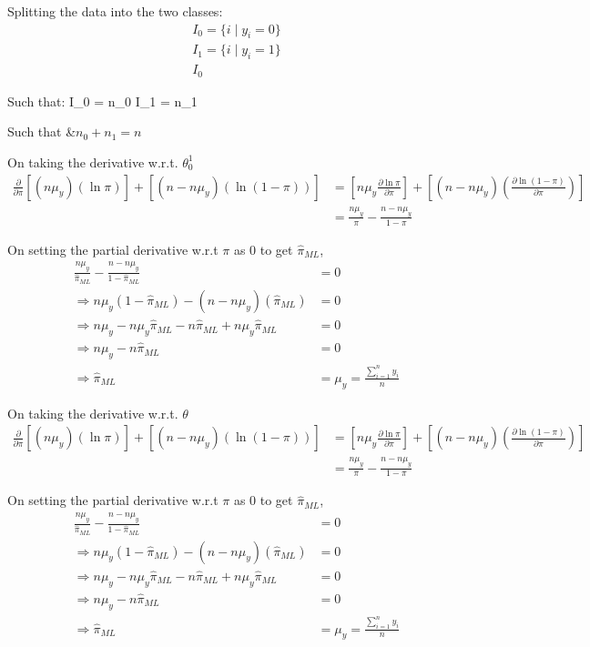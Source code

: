 \documentclass[openany,11pt]{homework}
\begin{document}
Splitting the data into the two classes: \\
\begin{align}
I_0 = \{i \mid y_i = 0\} \\
I_1 = \{i \mid y_i = 1\} \\
I_0 
\end{align}

Such that:
\mid I_0 \mid = n_0 
\mid I_1 \mid = n_1

Such that &$n_0 + n_1 = n$



On taking the derivative w.r.t. $\theta_{0}^{1}$\\
\begin{align}
\frac{\partial }{\partial \pi} [(n\mu_y) (\ln \pi)] + [(n - n\mu_y)(\ln (1-\pi))]
& = \left[n\mu_y \frac{\partial \ln \pi}{\partial \pi}\right] + \left[(n - n\mu_y)\left(\frac{\partial \ln(1-\pi)}{\partial \pi}\right)\right] \\
& = \frac{n\mu_y}{\pi} -\frac{n-n\mu_y}{1-\pi}
\end{align}

On setting the partial derivative w.r.t $\pi$ as 0 to get $\hat{\pi}_{ML}$,
\begin{align}
\frac{n\mu_y}{\hat{\pi}_{ML}} -\frac{n-n\mu_y}{1-\hat{\pi}_{ML}} & = 0 \\
\Rightarrow n\mu_y(1-\hat{\pi}_{ML}) - (n-n\mu_y)(\hat{\pi}_{ML}) & = 0 \\
\Rightarrow n\mu_y - n\mu_y\hat{\pi}_{ML} - n\hat{\pi}_{ML} + n\mu_y\hat{\pi}_{ML} & = 0 \\
\Rightarrow n\mu_y - n\hat{\pi}_{ML} & = 0 \\
\Rightarrow \hat{\pi}_{ML} & = \mu_y = \frac{\sum_{i=1}^{n} y_i}{n}
\end{align}

On taking the derivative w.r.t. $\theta$\\
\begin{align}
\frac{\partial }{\partial \pi} [(n\mu_y) (\ln \pi)] + [(n - n\mu_y)(\ln (1-\pi))]
& = \left[n\mu_y \frac{\partial \ln \pi}{\partial \pi}\right] + \left[(n - n\mu_y)\left(\frac{\partial \ln(1-\pi)}{\partial \pi}\right)\right] \\
& = \frac{n\mu_y}{\pi} -\frac{n-n\mu_y}{1-\pi}
\end{align}

On setting the partial derivative w.r.t $\pi$ as 0 to get $\hat{\pi}_{ML}$,
\begin{align}
\frac{n\mu_y}{\hat{\pi}_{ML}} -\frac{n-n\mu_y}{1-\hat{\pi}_{ML}} & = 0 \\
\Rightarrow n\mu_y(1-\hat{\pi}_{ML}) - (n-n\mu_y)(\hat{\pi}_{ML}) & = 0 \\
\Rightarrow n\mu_y - n\mu_y\hat{\pi}_{ML} - n\hat{\pi}_{ML} + n\mu_y\hat{\pi}_{ML} & = 0 \\
\Rightarrow n\mu_y - n\hat{\pi}_{ML} & = 0 \\
\Rightarrow \hat{\pi}_{ML} & = \mu_y = \frac{\sum_{i=1}^{n} y_i}{n}
\end{align}
\end{document}
